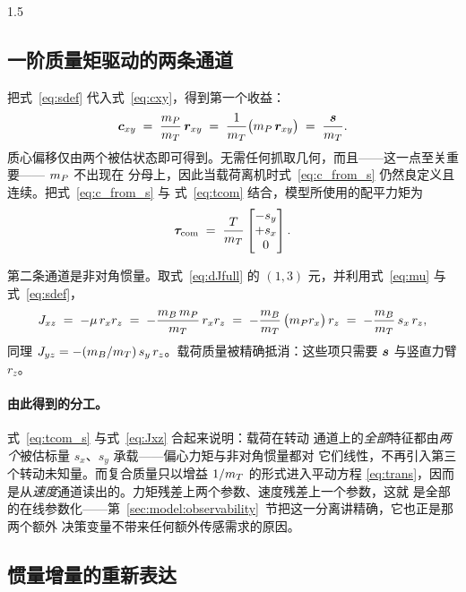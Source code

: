 \begin{spacing}{1.5}
\subsection{一阶质量矩驱动的两条通道}\label{sec:model:schannels}

把式~\eqref{eq:sdef} 代入式~\eqref{eq:cxy}，得到第一个收益：
\begin{equation}
\bm{c}_{xy} \;=\; \frac{m_P}{m_T}\,\bm{r}_{xy}
      \;=\; \frac{1}{m_T}\bigl(m_P\,\bm{r}_{xy}\bigr)
      \;=\; \frac{\bm{s}}{m_T}.
\label{eq:c_from_s}
\end{equation}
质心偏移仅由两个被估状态即可得到。无需任何抓取几何，而且——这一点至关重要—— $m_P$ 不出现在
分母上，因此当载荷离机时式~\eqref{eq:c_from_s} 仍然良定义且连续。把式~\eqref{eq:c_from_s} 与
式~\eqref{eq:tcom} 结合，模型所使用的配平力矩为
\begin{equation}
\bm{\tau}_{\mathrm{com}} \;=\; \frac{T}{m_T}\begin{bmatrix} -s_y \\ +s_x \\ 0\end{bmatrix}.
\label{eq:tcom_s}
\end{equation}

第二条通道是非对角惯量。取式~\eqref{eq:dJfull} 的 $(1,3)$ 元，并利用式~\eqref{eq:mu} 与
式~\eqref{eq:sdef}，
\begin{equation}
J_{xz} \;=\; -\mu\, r_x r_z
 \;=\; -\frac{m_B\,m_P}{m_T}\, r_x r_z
 \;=\; -\frac{m_B}{m_T}\,\bigl(m_P r_x\bigr)\, r_z
 \;=\; -\frac{m_B}{m_T}\, s_x\, r_z ,
\label{eq:Jxz}
\end{equation}
同理 $J_{yz} = -(m_B/m_T)\, s_y\, r_z$。载荷质量被精确抵消：这些项只需要 $\bm{s}$ 与竖直力臂
$r_z$。

\paragraph{由此得到的分工。}式~\eqref{eq:tcom_s} 与式~\eqref{eq:Jxz} 合起来说明：载荷在转动
通道上的\emph{全部}特征都由\emph{两个}被估标量 $s_x$、$s_y$ 承载——偏心力矩与非对角惯量都对
它们线性，不再引入第三个转动未知量。而复合质量只以增益 $1/m_T$ 的形式进入平动方程
\eqref{eq:trans}，因而是从\emph{速度}通道读出的。力矩残差上两个参数、速度残差上一个参数，这就
是全部的在线参数化——第~\ref{sec:model:observability}~节把这一分离讲精确，它也正是那两个额外
决策变量不带来任何额外传感需求的原因。

\subsection{惯量增量的重新表达}\label{sec:model:Jofs}


\end{spacing}
